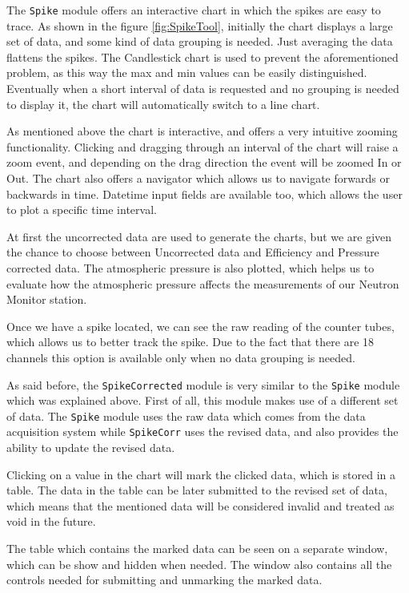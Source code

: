 \documentclass[a4paper]{jpconf}
\begin{document}
The \texttt{Spike} module offers an interactive chart in which the spikes
are easy to trace. As shown in the figure \ref{fig:SpikeTool}, initially the
chart displays a large set of data, and some kind of data grouping is needed.
Just averaging the data flattens the spikes.  The Candlestick chart is used to
prevent the aforementioned problem, as this way the max and min values can be
easily distinguished. Eventually when a short interval of data is requested and
no grouping is needed to display it, the chart will automatically switch to a
line chart.

As mentioned above the chart is interactive, and offers a very intuitive
zooming functionality. Clicking and dragging through an interval of the chart will
raise a zoom event, and depending on the drag direction the event will be zoomed In
or Out. The chart also offers a navigator which allows us to navigate forwards or
backwards in time. Datetime input fields are available too, which allows the user to
plot a specific time interval.

At first the uncorrected data are used to generate the charts, but we are given
the chance to choose between Uncorrected data and Efficiency and Pressure corrected
data. The atmospheric pressure is also plotted, which helps us to evaluate how the
atmospheric pressure affects the measurements of our Neutron Monitor station.

Once we have a spike located, we can see the raw reading of the counter tubes,
which allows us to better track the spike. Due to the fact that there are 18
channels this option is available only when no data grouping is needed.

As said before, the \texttt{SpikeCorrected} module is very similar to the
\texttt{Spike} module which was explained above. First of all, this module makes
use of a different set of data. The \texttt{Spike} module uses the raw data which
comes from the data acquisition system while \texttt{SpikeCorr} uses the
revised data, and also provides the ability to update the revised data.

Clicking on a value in the chart will mark the clicked data, which is
stored in a table. The data in the table can be later submitted to the revised
set of data, which means that the mentioned data will be considered invalid and
treated as void in the future.

The table which contains the marked data can be seen on a separate window, which
can be show and hidden when needed. The window also contains all the
controls needed for submitting and unmarking the marked data.
\end{document}
